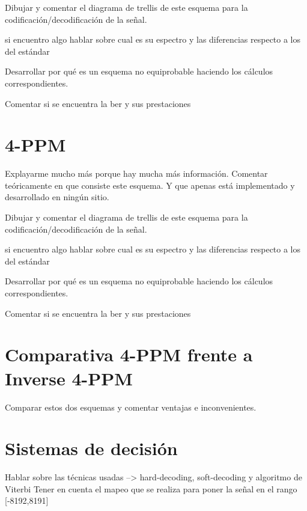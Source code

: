 Dibujar y comentar el diagrama de trellis de este esquema para la codificación/decodificación de la señal.

si encuentro algo hablar sobre cual es su espectro y las diferencias respecto a los del estándar

Desarrollar por qué es un esquema no equiprobable haciendo los cálculos correspondientes.

Comentar si se encuentra la ber y sus prestaciones

\section{4-PPM}
Explayarme mucho más porque hay mucha más información.
Comentar teóricamente en que consiste este esquema.
Y que apenas está implementado y desarrollado en ningún sitio.

Dibujar y comentar el diagrama de trellis de este esquema para la codificación/decodificación de la señal.

si encuentro algo hablar sobre cual es su espectro y las diferencias respecto a los del estándar

Desarrollar por qué es un esquema no equiprobable haciendo los cálculos correspondientes.

Comentar si se encuentra la ber y sus prestaciones

\section{Comparativa 4-PPM frente a Inverse 4-PPM}
Comparar estos dos esquemas y comentar ventajas e inconvenientes.

\section{Sistemas de decisión}
Hablar sobre las técnicas usadas --> hard-decoding, soft-decoding y algoritmo de Viterbi
Tener en cuenta el mapeo que se realiza para poner la señal en el rango [-8192,8191]

\chapterend{}
